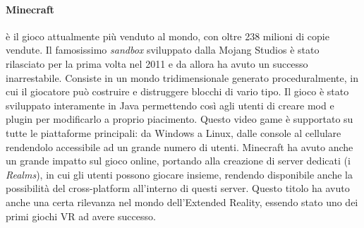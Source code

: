         \paragraph{Minecraft} è il gioco attualmente più venduto al mondo, con oltre 238 milioni di copie vendute. Il famosissimo \textit{sandbox} sviluppato dalla Mojang Studios è stato
            rilasciato per la prima volta nel 2011 e da allora ha avuto un successo inarrestabile. Consiste in un mondo tridimensionale generato proceduralmente, in cui il giocatore
            può costruire e distruggere blocchi di vario tipo. Il gioco è stato sviluppato interamente in Java permettendo così agli utenti di creare mod e plugin per modificarlo
            a proprio piacimento. Questo video game è supportato su tutte le piattaforme principali: da Windows a Linux, dalle console al cellulare rendendolo accessibile ad un grande
            numero di utenti. Minecraft ha avuto anche un grande impatto sul gioco online, portando alla creazione di server dedicati (i \textit{Realms}), in cui gli utenti possono 
            giocare insieme, rendendo disponibile anche la possibilità del cross-platform all'interno di questi server. Questo titolo ha avuto anche una certa rilevanza nel mondo
            dell'Extended Reality, essendo stato uno dei primi giochi VR ad avere successo.

